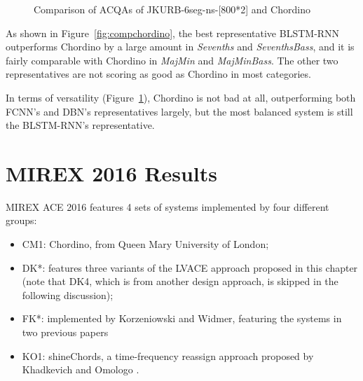 \begin{figure}[htb]
	\centering
	\caption{Comparison of ACQAs of JKURB-6seg-ns-[800*2] and Chordino}
	\label{fig:acqachordino}
\end{figure}

As shown in Figure~\ref{fig:compchordino}, the best representative BLSTM-RNN outperforms Chordino by a large amount in \textit{Sevenths} and \textit{SeventhsBass}, and it is fairly comparable with Chordino in \textit{MajMin} and \textit{MajMinBass}. The other two representatives are not scoring as good as Chordino in most categories.

In terms of versatility (Figure~\ref{fig:acqachordino}), Chordino is not bad at all, outperforming both FCNN's and DBN's representatives largely, but the most balanced system is still the BLSTM-RNN's representative.

\section{MIREX 2016 Results}
MIREX ACE 2016 features 4 sets of systems implemented by four different groups:
\begin{itemize}
\item CM1: Chordino, from Queen Mary University of London;
\item DK*: features three variants of the LVACE approach proposed in this chapter (note that DK4, which is from another design approach, is skipped in the following discussion);
\item FK*: implemented by Korzeniowski and Widmer, featuring the systems in two previous papers \cite{Korzeniowski2016feature,Korzeniowski2016convolutional}
\item KO1: shineChords, a time-frequency reassign approach proposed by Khadkevich and Omologo \cite{khadkevich2011time}.
\end{itemize}

